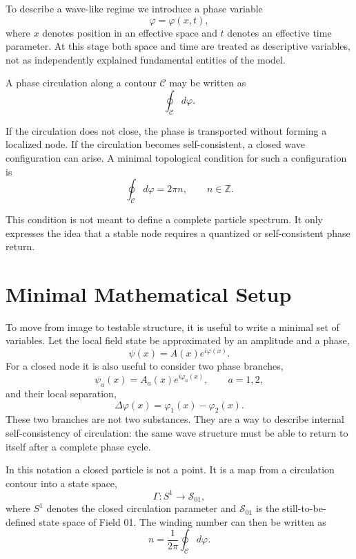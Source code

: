 \documentclass[11pt,a4paper]{article}
\newcommand{\phase}{\varphi}
\newcommand{\contour}{\mathcal{C}}
\begin{document}
To describe a wave-like regime we introduce a phase variable
\begin{equation}
\phase = \phase(x,t),
\end{equation}
where $x$ denotes position in an effective space and $t$ denotes an effective time parameter. At this stage both space and time are treated as descriptive variables, not as independently explained fundamental entities of the model.

A phase circulation along a contour $\contour$ may be written as
\begin{equation}
\oint_{\contour} d\phase.
\end{equation}

If the circulation does not close, the phase is transported without forming a localized node. If the circulation becomes self-consistent, a closed wave configuration can arise. A minimal topological condition for such a configuration is
\begin{equation}
\oint_{\contour} d\phase = 2\pi n, \qquad n \in \mathbb{Z}.
\end{equation}

This condition is not meant to define a complete particle spectrum. It only expresses the idea that a stable node requires a quantized or self-consistent phase return.

\section{Minimal Mathematical Setup}

To move from image to testable structure, it is useful to write a minimal set of variables. Let the local field state be approximated by an amplitude and a phase,
\begin{equation}
\psi(x)=A(x)e^{i\phase(x)}.
\end{equation}
For a closed node it is also useful to consider two phase branches,
\begin{equation}
\psi_a(x)=A_a(x)e^{i\phase_a(x)}, \qquad a=1,2,
\end{equation}
and their local separation,
\begin{equation}
\Delta\phase(x)=\phase_1(x)-\phase_2(x).
\end{equation}
These two branches are not two substances. They are a way to describe internal self-consistency of circulation: the same wave structure must be able to return to itself after a complete phase cycle.

In this notation a closed particle is not a point. It is a map from a circulation contour into a state space,
\begin{equation}
\Gamma:S^1\longrightarrow\mathcal{S}_{01},
\end{equation}
where $S^1$ denotes the closed circulation parameter and $\mathcal{S}_{01}$ is the still-to-be-defined state space of Field 01. The winding number can then be written as
\begin{equation}
n=\frac{1}{2\pi}\oint_{\contour}d\phase.
\end{equation}
\end{document}
